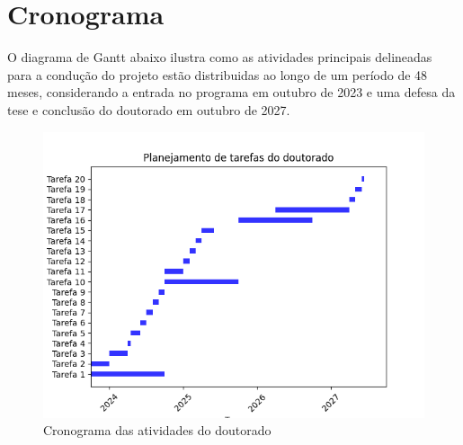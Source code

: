 \documentclass[12pt]{article}
\begin{document}
\section{Cronograma}
O diagrama de Gantt abaixo ilustra como as atividades principais delineadas para a condução do projeto estão distribuidas ao longo de um período de 48 meses, considerando a entrada no programa em outubro de 2023 e uma defesa da tese e conclusão do doutorado em outubro de 2027.


\begin{figure}[H]
    \centering
    \includegraphics[width=\textwidth]{cronograma.png}
    \caption{Cronograma das atividades do doutorado}
    \label{fig:exemplo}
\end{figure}
\end{document}
